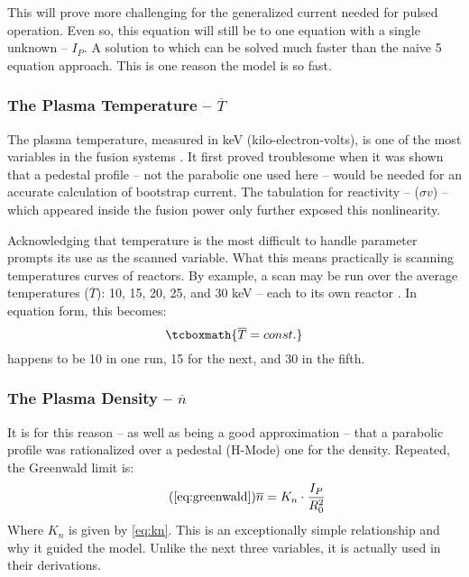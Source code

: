 This will prove more challenging for the generalized current needed for pulsed operation. Even so, this equation will still be  to one equation with a single unknown -- $I_P$. A solution to which can be solved much faster than the naive 5 equation approach. This is one reason the model is so fast.

\subsubsection{The Plasma Temperature -- $\overline T$}

The plasma temperature, measured in keV (kilo-electron-volts), is one of the most  variables in the fusion systems . It first proved troublesome when it was shown that a pedestal profile -- not the parabolic one used here -- would be needed for an accurate calculation of bootstrap current. The  tabulation for reactivity -- ($\sigma v$) -- which appeared inside the fusion power only further exposed this nonlinearity.

Acknowledging that temperature is the most difficult to handle parameter prompts its use as the scanned variable. What this means practically is scanning temperatures  curves of reactors. By example, a scan may be run over the average temperatures ($\overline T$): 10, 15, 20, 25, and 30 keV --  each  to its own reactor . In equation form, this becomes:
\begin{equation}
	\label{eq:tbar}
	\tcboxmath{
	\overline T = const.
	}
\end{equation}
 happens to be 10  in one run, 15  for the next, and 30  in the fifth.

\subsubsection{The Plasma Density -- $\overline n$}

 It is for this reason -- as well as being a good approximation -- that a parabolic profile was rationalized over a pedestal (H-Mode) one for the density. Repeated, the Greenwald limit is:
\begin{equation}
	\tag{\ref{eq:greenwald}}
	\overline n = K_n \cdot \frac{I_P}{R_0^2}
\end{equation}
Where $K_n$ is given by \cref{eq:kn}. This is an exceptionally simple relationship and why it guided the model. Unlike the next three variables, it is actually used in their derivations. 

